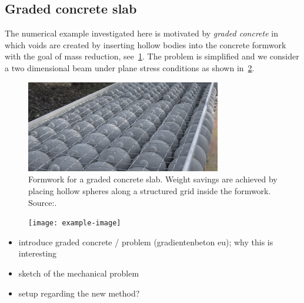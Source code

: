 \documentclass[a4paper]{eccomas_paper-2024}
\begin{document}

\subsection{Graded concrete slab} %
\label{sub:Graded concrete slab}
The numerical example investigated here is motivated by \textit{graded concrete} in which voids are created by inserting hollow bodies into the concrete formwork with the goal of mass reduction, see~\cref{fig:gradientenbeton}.
The problem is simplified and we consider a two dimensional beam under plane stress conditions as shown in~\cref{fig:beam_sketch}.

\begin{figure}
    \begin{center}
        \includegraphics[keepaspectratio,height=4cm]{gradientenbeton_formwork.jpg}
    \end{center}
    \caption{Formwork for a graded concrete slab. Weight savings are achieved by placing hollow spheres along a structured grid inside the formwork. Source:\gradientenbetonurl.}\label{fig:gradientenbeton}
\end{figure}

\begin{figure}
    \begin{center}
        \texttt{[image: example-image]}
    \end{center}
    \caption{}\label{fig:beam_sketch}
\end{figure}



\begin{itemize}
    \item introduce graded concrete / problem (gradientenbeton eu); why this is interesting
    \item sketch of the mechanical problem
    \item setup regarding the new method?
\end{itemize}
\end{document}
